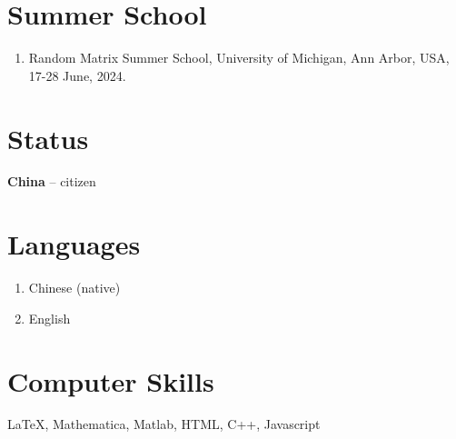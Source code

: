 \documentclass[margin]{res}
\begin{document}
\begin{resume}
\section{Summer School}
\begin{enumerate}[--]
   \item Random Matrix Summer School, University of Michigan, Ann Arbor, USA, 17-28 June, 2024.
\end{enumerate}

\section{Status}
\textbf{China} -- citizen

\section{Languages}
\begin{enumerate}[--]
\item Chinese (native)
\item English 
\end{enumerate}

\section{Computer Skills}
\LaTeX, Mathematica, Matlab, HTML, C++, Javascript

\end{resume}
\end{document}
